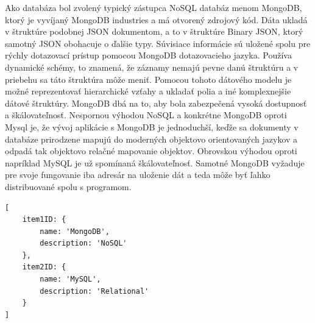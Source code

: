 Ako databáza bol zvolený typický zástupca NoSQL databáz menom MongoDB, ktorý je vyvíjaný MongoDB industries a má otvorený zdrojový kód. Dáta ukladá v štruktúre podobnej JSON dokumentom, a to v štruktúre Binary JSON, ktorý samotný JSON obohacuje o ďalšie typy. Súvisiace informácie sú uložené spolu pre rýchly dotazovací prístup pomocou MongoDB dotazovacieho jazyka. Používa dynamické schémy, to znamená, že záznamy nemajú pevne danú štruktúru a v priebehu sa táto štruktúra môže meniť. Pomocou tohoto dátového modelu je možné reprezentovať hierarchické vzťahy a ukladať polia a iné komplexnejšie dátové štruktúry. MongoDB dbá na to, aby bola zabezpečená vysoká dostupnosť a škálovateľnosť. Nespornou výhodou NoSQL a konkrétne MongoDB oproti Mysql je, že vývoj aplikácie s MongoDB je jednoduchší, keďže sa dokumenty v databáze prirodzene mapujú do moderných objektovo orientovaných jazykov a odpadá tak objektovo relačné mapovanie objektov. Obrovskou výhodou oproti napríklad MySQL je už spomínaná škálovateľnosť. Samotné MongoDB vyžaduje pre svoje fungovanie iba adresár na uloženie dát a teda môže byť ľahko distribuované spolu s programom. \cite{9egOMsyThyK0MyF2}
\begin{lstlisting}[caption={Ukážka štruktúry NoSQL MongoDB databáze.},captionpos=b]
[
    item1ID: {
	    name: 'MongoDB',
	    description: 'NoSQL'
    },
    item2ID: {
	    name: 'MySQL',
	    description: 'Relational'
    }
]
\end{lstlisting}